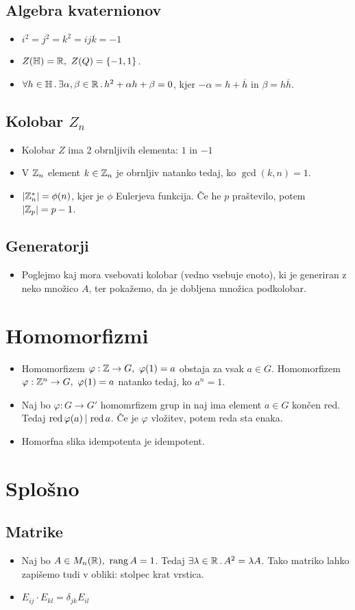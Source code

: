 \subsection{Algebra kvaternionov}
\begin{itemize}
    \item \(i^2=j^2=k^2=ijk=-1\)
    \item \(Z(\mathbb{H}) = \mathbb{R}, \ Z(Q) = \{-1, 1\}\).
    \item \(\forall h \in \mathbb{H} \,.\, \exists \alpha, \beta \in \mathbb{R} \,.\, h^2 + \alpha h + \beta = 0\), kjer \(-\alpha = h + \overline{h}\) in \(\beta = h \overline{h}\).
\end{itemize}

\subsection{Kolobar \(Z_n\)}
\begin{itemize}
    \item Kolobar \(Z\) ima 2 obrnljivih elementa: \(1\) in \(-1\)
    \item V \(\mathbb{Z}_n\) element \(k \in \mathbb{Z}_n\) je obrnljiv natanko tedaj, ko \(\gcd (k, n) = 1\).
    \item \(|\mathbb{Z}_n^*| = \phi(n)\), kjer je \(\phi\) Eulerjeva funkcija. Če he \(p\) praštevilo, potem \(|\mathbb{Z}_p| = p - 1\).
\end{itemize}

\subsection{Generatorji}
\begin{itemize}
    \item Poglejmo kaj mora vsebovati kolobar (vedno vsebuje enoto), ki je generiran z neko množico \(A\), ter pokažemo, da je dobljena množica podkolobar.
\end{itemize}


\section{Homomorfizmi}
\begin{itemize}
    \item Homomorfizem \(\varphi: \Z \to G, \ \varphi(1) = a\) obstaja za vsak \(a \in G\). Homomorfizem \(\varphi: \Z^n \to G, \ \varphi(1) = a\) natanko tedaj, ko \(a^n = 1\).
    \item Naj bo \(\varphi: G \to G'\) homomrfizem grup in naj ima element \(a \in G\) končen red. Tedaj \(\operatorname{red} \varphi(a) \, | \, \operatorname{red} a\). Če je \(\varphi\) vložitev, potem reda sta enaka.
    \item Homorfna slika idempotenta je idempotent.
\end{itemize}

\section{Splošno}
\subsection{Matrike}
\begin{itemize}
    \item Naj bo \(A \in M_n(\mathbb{R}), \ \operatorname{rang} A = 1\). Tedaj \(\exists \lambda \in \mathbb{R} \,.\, A^2 = \lambda A\). Tako matriko lahko zapišemo tudi v obliki: stolpec krat vrstica.
    \item \(E_{ij} \cdot E_{kl} = \delta_{jk}E_{il}\)
\end{itemize}
